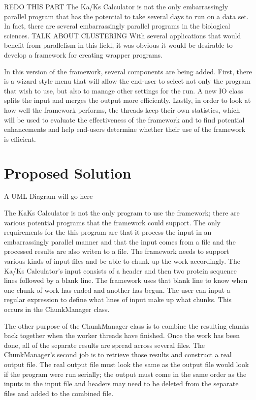 \documentclass[12pt]{article}
\begin{document}
REDO THIS PART
The Ka/Ks Calculator is not the only embarrassingly parallel program that has the
potential to take several days to run on a data set. In fact, there are several
embarrassingly parallel programs in the biological sciences. 
TALK ABOUT CLUSTERING
With several applications that 
would benefit from parallelism in this field, it was obvious it would be 
desirable to develop a framework for creating wrapper programs.


In this version of the framework, several components are being added. First, 
there is a wizard style menu that will allow the end-user to select not only the 
program that wish to use, but also to manage other settings for the run. A new 
IO class splits the input and merges the output more efficiently. Lastly, in 
order to look at how well the framework performs, the threads keep their own 
statistics, which will be used to evaluate the effectiveness of the framework 
and to find potential enhancements and help end-users determine whether their 
use of the framework is efficient.

\section{Proposed Solution}

A UML Diagram will go here

The KaKs Calculator is not the only program to use the framework; there are
various potential programs that the framework could support. The only 
requirements for the this program are that it process the input in an 
embarrassingly parallel manner and that the input comes from a file and the 
processed results are also writen to a file. The framework needs to support 
various kinds of input files and be able to chunk up the work accordingly. The 
Ka/Ks Calculator's input consists of a header and then two protein sequence 
lines followed by a blank line. The framework uses that blank line to know when 
one chunk of work has ended and another has begun. The user can input a regular 
expression to define what lines of input make up what chunks. This occurs in 
the ChunkManager class. 

The other purpose of the ChunkManager class is to combine the resulting chunks 
back together when the worker threads have finished. Once the work has been
done, all of the separate results are spread across several files. The
ChunkManager's second job is to retrieve those results and construct a real
output file. The real output file must look the same as the output file would
look if the program were run serially; the output must come in the same order as
the inputs in the input file and headers may need to be deleted from the
separate files and added to the combined file.
\end{document}
